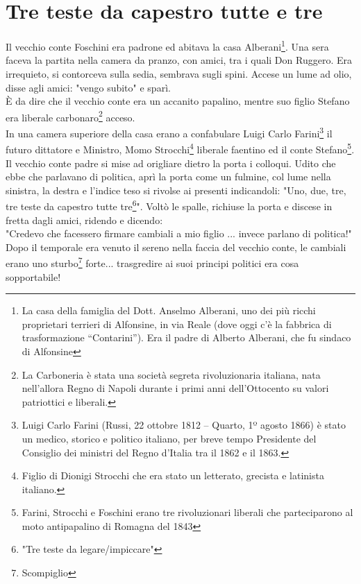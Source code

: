 \documentclass[10pt]{memoir} %
\begin{document}
\chapter{Tre teste da capestro tutte e tre}
Il vecchio conte Foschini era padrone ed abitava la casa Alberani\footnote{La casa della famiglia del Dott. Anselmo Alberani, uno dei più ricchi proprietari terrieri di Alfonsine, in via Reale (dove oggi c’è la fabbrica di trasformazione “Contarini”). Era il padre di Alberto Alberani, che fu sindaco di Alfonsine}. Una sera faceva la partita nella camera da pranzo, con amici, tra i quali Don Ruggero. Era irrequieto, si contorceva sulla sedia, sembrava sugli spini. Accese un lume ad olio, disse agli amici: "vengo subito" e sparì.\\
È da dire che il vecchio conte era un accanito papalino, mentre suo figlio Stefano era liberale carbonaro\footnote{La Carboneria è stata una società segreta rivoluzionaria italiana, nata nell'allora Regno di Napoli durante i primi anni dell’Ottocento su valori patriottici e liberali.} acceso. \\
In una camera superiore della casa erano a confabulare Luigi Carlo Farini\footnote{Luigi Carlo Farini (Russi, 22 ottobre 1812 – Quarto, 1º agosto 1866) è stato un medico, storico e politico italiano, per breve tempo Presidente del Consiglio dei ministri del Regno d'Italia tra il 1862 e il 1863.} il futuro dittatore e Ministro, Momo Strocchi\footnote{Figlio di Dionigi Strocchi che era stato un letterato, grecista e latinista italiano.} liberale faentino ed il conte Stefano\footnote{Farini, Strocchi e Foschini erano tre rivoluzionari liberali che parteciparono al moto antipapalino di Romagna del 1843}. Il vecchio conte padre si mise ad origliare dietro la porta i colloqui. Udito che ebbe che parlavano di politica, aprì la porta come un fulmine, col lume nella sinistra, la destra e l'indice teso si rivolse ai presenti indicandoli: "Uno, due, tre, tre teste da capestro tutte tre\footnote{"Tre teste da legare/impiccare"}". Voltò le spalle, richiuse la porta e discese in fretta dagli amici, ridendo e dicendo:\\
"Credevo che facessero firmare cambiali a mio figlio ... invece parlano di politica!"\\
Dopo il temporale era venuto il sereno nella faccia del vecchio conte, le cambiali erano uno sturbo\footnote{Scompiglio} forte... trasgredire ai suoi principi politici era cosa sopportabile!
\end{document}
